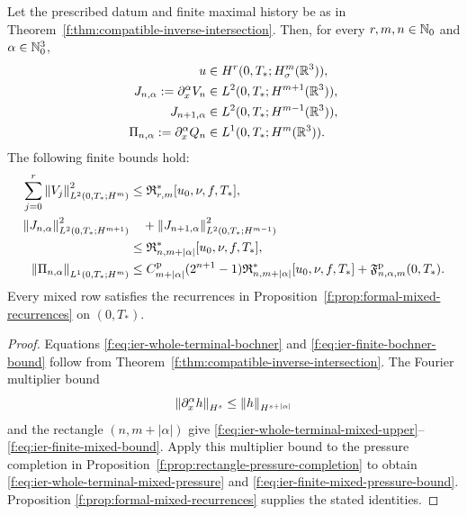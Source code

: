 \begin{corollary}
\label{f:cor:ier-whole-terminal-mixed-jet}
Let the prescribed datum and finite maximal history be as in
Theorem~\ref{f:thm:compatible-inverse-intersection}.  Then, for every
\(r,m,n\in\mathbb N_0\) and \(\alpha\in\mathbb N_0^3\),
\begin{align}
 u&\in H^r(0,T_*;H^m_\sigma(\mathbb R^3)),
 \label{f:eq:ier-whole-terminal-bochner}\\
 J_{n,\alpha}:=\partial_x^\alpha V_n
 &\in L^2(0,T_*;H^{m+1}(\mathbb R^3)),
 \label{f:eq:ier-whole-terminal-mixed-upper}\\
 J_{n+1,\alpha}
 &\in L^2(0,T_*;H^{m-1}(\mathbb R^3)),
 \label{f:eq:ier-whole-terminal-mixed-lower}\\
 \Pi_{n,\alpha}:=\partial_x^\alpha Q_n
 &\in L^1(0,T_*;H^m(\mathbb R^3)).
 \label{f:eq:ier-whole-terminal-mixed-pressure}
\end{align}
The following finite bounds hold:
\begin{align}
 \sum_{j=0}^{r}\left\lVert V_j\right\rVert_{L^2(0,T_*;H^m)}^2
 &\le\mathfrak R_{r,m}^*[u_0,\nu,f,T_*],
 \label{f:eq:ier-finite-bochner-bound}\\
 \left\lVert J_{n,\alpha}\right\rVert_{L^2(0,T_*;H^{m+1})}^2
 &\quad+\left\lVert J_{n+1,\alpha}\right\rVert_{L^2(0,T_*;H^{m-1})}^2
 \notag\\
 &\le\mathfrak R_{n,m+|\alpha|}^*[u_0,\nu,f,T_*],
 \label{f:eq:ier-finite-mixed-bound}\\
 \left\lVert \Pi_{n,\alpha}\right\rVert_{L^1(0,T_*;H^m)}
 &\le C_{m+|\alpha|}^{\rm p}(2^{n+1}-1)
 \mathfrak R_{n,m+|\alpha|}^*[u_0,\nu,f,T_*]
 +\mathfrak F^{\rm p}_{n,\alpha,m}(0,T_*).
 \label{f:eq:ier-finite-mixed-pressure-bound}
\end{align}
Every mixed row satisfies the recurrences in
Proposition~\ref{f:prop:formal-mixed-recurrences} on \((0,T_*)\).
\end{corollary}

\begin{proof}
Equations \eqref{f:eq:ier-whole-terminal-bochner} and
\eqref{f:eq:ier-finite-bochner-bound} follow from
Theorem~\ref{f:thm:compatible-inverse-intersection}.  The Fourier multiplier
bound
\[
 \left\lVert \partial_x^\alpha h\right\rVert_{H^s}
 \le\left\lVert h\right\rVert_{H^{s+|\alpha|}}
\]
and the rectangle \((n,m+|\alpha|)\) give
\eqref{f:eq:ier-whole-terminal-mixed-upper}--%
\eqref{f:eq:ier-finite-mixed-bound}.  Apply this multiplier bound to the
pressure completion in Proposition~\ref{f:prop:rectangle-pressure-completion}
to obtain \eqref{f:eq:ier-whole-terminal-mixed-pressure} and
\eqref{f:eq:ier-finite-mixed-pressure-bound}.  Proposition
\ref{f:prop:formal-mixed-recurrences} supplies the stated identities.
\end{proof}

